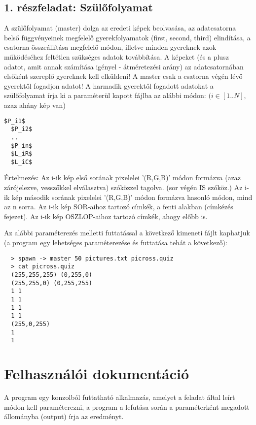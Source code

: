 \documentclass[12pt]{article}
\begin{document}
\subsection{1. részfeladat: Szülőfolyamat}

A szülőfolyamat (master) dolga az eredeti képek beolvasása, az adatcsatorna belső függvényeinek megfelelő gyerekfolyamatok (first, second, third) elindítása, a csatorna összeállítása megfelelő módon, illetve minden gyereknek azok működéséhez feltétlen szükséges adatok továbbítása. A képeket (és a plusz adatot, amit annak számítása igényel - átméretezési arány) az adatcsatornában elsőként szereplő gyereknek kell elküldeni! A master csak a csatorna végén lévő gyerektől fogadjon adatot! A harmadik gyerektől fogadott adatokat a szülőfolyamat írja ki a paraméterül kapott fájlba az alábbi módon: $(i \in [1..N]$, azaz ahány kép van)

\begin{lstlisting}[mathescape, columns=fullflexible,  basicstyle=\ttfamily,]
  $P_i1$
  $P_i2$
  ..
  $P_in$
  $L_iR$
  $L_iC$
\end{lstlisting}

Értelmezés: Az i-ik kép első sorának pixelelei '(R,G,B)' módon formázva (azaz zárójelezve, vesszőkkel elválasztva) szóközzel tagolva. (sor végén IS szóköz.) Az i-ik kép második sorának pixelelei '(R,G,B)' módon formázva hasonló módon, mind az n sorra. Az i-ik kép SOR-aihoz tartozó címkék, a fenti alakban (címkézés fejezet). Az i-ik kép OSZLOP-aihoz tartozó címkék, ahogy előbb is.

Az alábbi paraméterezés melletti futtatással a következő kimeneti fájlt kaphatjuk (a program egy lehetséges paraméterezése és futtatása tehát a következő):

\begin{verbatim}
  > spawn -> master 50 pictures.txt picross.quiz
  > cat picross.quiz
  (255,255,255) (0,255,0) 
  (255,255,0) (0,255,255) 
  1 1 
  1 1 
  1 1 
  1 1 
  (255,0,255) 
  1 
  1 
\end{verbatim}

\section{Felhasználói dokumentáció}

A program egy konzolból futtatható alkalmazás, amelyet a feladat által leírt módon kell paraméterezni, a program a lefutása során a paraméterként megadott állományba (output) írja az eredményt.
\end{document}
